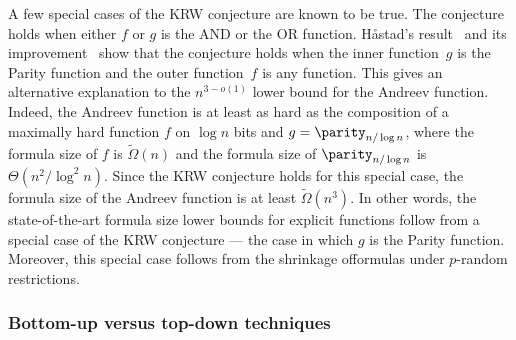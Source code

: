\documentclass[11pt]{article}
\numberwithin{equation}{section}
\theoremstyle{definition}
\theoremstyle{plain}
\theoremstyle{definition}\newtheorem{notation}[theorem]{Notation}\theoremstyle{plain}
\begin{document}
A few special cases of the KRW conjecture are known to be true. The
conjecture holds when either $f$ or $g$ is the AND or the OR function.
H{\aa}stad's result~\cite{H98} and its improvement~\cite{T14}
show that the conjecture holds when the inner function~$g$ is the
Parity function and the outer function~$f$ is any function. This
gives an alternative explanation to the $n^{3-o(1)}$ lower bound
for the Andreev function. Indeed, the Andreev function is at least
as hard as the composition of a maximally hard function $f$ on $\log n$
bits and $g=\parity_{n/\log n}$, where the formula size of $f$ is
$\tilde{\Omega}(n)$ and the formula size of $\parity_{n/\log n}$
is $\Theta(n^{2}/\log^{2}n)$. Since the KRW conjecture holds for
this special case, the formula size of the Andreev function is at
least $\tilde{\Omega}(n^{3})$. In other words, the state-of-the-art
formula size lower bounds for explicit functions follow from a special
case of the KRW conjecture --- the case in which $g$ is the Parity
function. Moreover, this special case follows from the shrinkage offormulas under $p$-random restrictions.

%
\subsubsection{Bottom-up versus top-down techniques}
%
\end{document}
